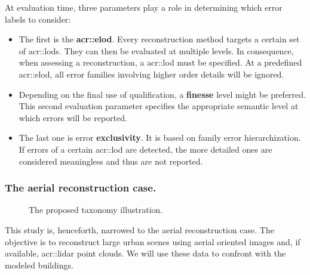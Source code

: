 \documentclass[runningheads]{llncs}
\begin{document}
At evaluation time, three parameters play a role in determining which error labels to consider:
\begin{itemize}
    \item The first is the \textbf{\acrfull{acr::elod}}. Every reconstruction method targets a certain set of \glspl{acr::lod}. They can then be evaluated at multiple levels. In consequence, when assessing a reconstruction, a \acrshort{acr::lod} must be specified. At a predefined \acrshort{acr::elod}, all error families involving higher order details will be ignored.
    \item Depending on the final use of qualification, a \textbf{finesse} level might be preferred. This second evaluation parameter specifies the appropriate semantic level at which errors will be reported.
    \item The last one is error \textbf{exclusivity}. It is based on family error hierarchization. If errors of a certain \acrshort{acr::lod} are detected, the more detailed ones are considered meaningless and thus are not reported.
\end{itemize}

\subsubsection{The aerial reconstruction case.}
  \begin{figure}
        \begin{center}
            
            \caption{\label{fig::taxonomy} The proposed taxonomy illustration. }
        \end{center}
    \end{figure}
This study is, henceforth, narrowed to the aerial reconstruction case. The objective is to reconstruct large urban scenes using aerial oriented images and, if available, \acrshort{acr::lidar} point clouds. We will use these data  to confront with the modeled buildings.
\end{document}
